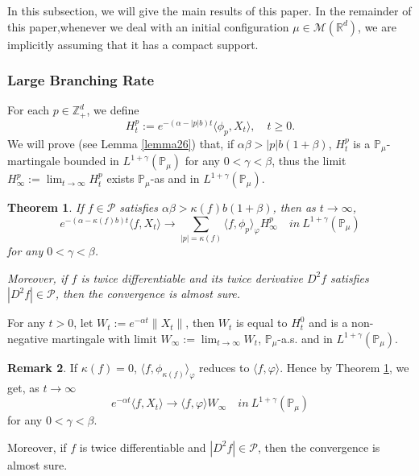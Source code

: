 \documentclass[12pt,oneside,english]{amsart}
\theoremstyle{plain}
\newtheorem{thm}{Theorem}[section]
\theoremstyle{definition}
\newtheorem{rem}[thm]{Remark}
\numberwithin{equation}{section}
\begin{document}
In this subsection, we will give the main results of this paper. In the remainder of this paper,whenever we deal with an initial configuration $\mu \in \mathcal{M}(\mathbb{R}^d)$, we are implicitly assuming that it has a compact support.
\subsubsection{Large Branching Rate}

For each $p\in \mathbb{Z}_+^d$, we define
$$H_t^p:= e^{-(\alpha-|p|b)t}\langle\phi_p,X_t\rangle,\quad t\geq 0.$$
 We will prove (see Lemma \ref{lemma26}) that, if $\alpha\beta>|p|b(1+\beta)$, $H_t^p$ is a $\mathbb{P}_{\mu}$-martingale bounded in $L^{1+\gamma}(\mathbb{P}_{\mu})$ for any $0<\gamma<\beta$, thus the limit $H^p_{\infty}:=\lim_{t\rightarrow \infty}H_t^p$ exists $\mathbb{P}_{\mu}$-as and in $L^{1+\gamma}(\mathbb{P}_{\mu})$.
 \begin{thm}\label{Theorem11}
     If $f \in \mathcal{P}$ satisfies $\alpha\beta>\kappa(f)b(1+\beta)$, then as $t\rightarrow \infty$,
     $$e^{-(\alpha-\kappa(f)b)t}\langle f, X_t\rangle \rightarrow\sum_{|p|=\kappa(f)}\langle f, \phi_p\rangle_{\varphi} H_{\infty}^p \quad in~ L^{1+\gamma}(\mathbb{P}_{\mu})$$
     for any $0<\gamma<\beta$.

     Moreover, if $f$ is twice differentiable and its twice derivative $D^2 f$ satisfies $|D^2 f| \in \mathcal{P}$, then the convergence is almost sure.
 \end{thm}
For any $t>0$, let $W_t:=e^{-\alpha t}\|X_t\|$, then $W_t$ is equal to $H_t^0$ and is a non-negative martingale with limit $W_{\infty}:=\lim_{t\rightarrow\infty}W_t$,  $\mathbb{P}_{\mu}$-a.s. and in $L^{1+\gamma}(\mathbb{P}_{\mu})$.
 \begin{rem}
    If $\kappa(f)=0$, $\langle f, \phi_{\kappa(f)}\rangle_{\varphi}$ reduces to $\langle f,\varphi\rangle$. Hence by Theorem \ref{Theorem11}, we get, as $t\rightarrow \infty$
     $$e^{-\alpha t}\langle f, X_t\rangle \rightarrow \langle f, \varphi\rangle W_{\infty} \quad in~ L^{1+\gamma}(\mathbb{P}_{\mu})$$
    for any $0<\gamma<\beta$.

    Moreover, if $f$ is twice differentiable and $|D^2 f| \in \mathcal{P}$, then the convergence is almost sure.
 \end{rem}
\end{document}
